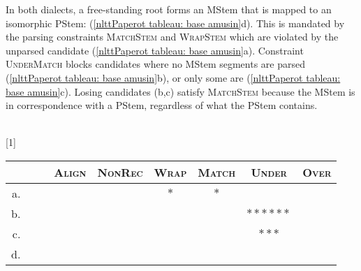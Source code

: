 






















In both dialects, a free-standing root forms an MStem that is mapped to an isomorphic PStem: \textit{} (\ref{nlttPaperot tableau: base amusin}d). This is mandated by the parsing constraints \textsc{MatchStem} and \textsc{WrapStem} which are violated by the unparsed candidate (\ref{nlttPaperot tableau: base amusin}a). Constraint \textsc{UnderMatch} blocks candidates where no MStem segments are parsed (\ref{nlttPaperot tableau: base amusin}b), or only some are (\ref{nlttPaperot tableau: base amusin}c). Losing candidates (b,c) satisfy \textsc{MatchStem} because the MStem is in correspondence with a PStem, regardless of what the PStem contains. 






\begin{exe}
	\ex ~\\
	
	\vspace{-1cm}\label{nlttPaperot tableau: base amusin}\renewcommand*\arraystretch{1.2}
	\scalebox{1}[1]{\begin{tabular}[t]{|rrl||c:c:c:c:c:c|} \hline
			 & \textsc{Align} & \textsc{NonRec} & \textsc{Wrap} & \textsc{Match} & \textsc{Under} & \textsc{Over} \\[0.5ex]
			
			\hline
			\hline a. & &  & & & $\ast$ & $\ast$ & & \\
			\hline b. & &  & & & & & $\ast\ast\ast\ast\ast\ast$ & \\
			\hline c. & &  & & & & & $\ast\ast\ast$ & \\
			\hline d. &  &  & & & & & & \\
			\hline \end{tabular}} \renewcommand*\arraystretch{1} 
	
\end{exe}







